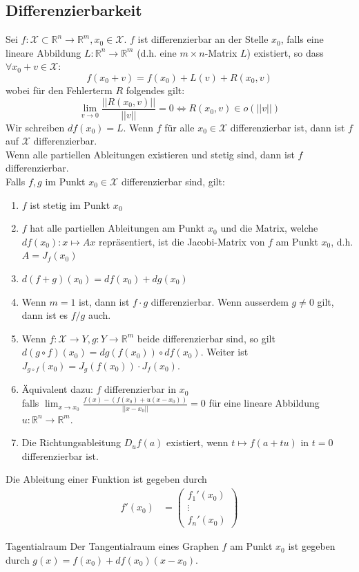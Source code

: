 \documentclass[a4paper,10pt]{article}
\def\R{\mathbb{R}}
\def\X{\mathcal{X}}
\begin{document}
\subsection{Differenzierbarkeit}
Sei \(f: \X \subset \R^n \to \R^m, x_0 \in \X\). \(f\) ist differenzierbar an der Stelle \(x_0\), falls eine lineare Abbildung \(L: \R^n \to \R^m\) (d.h. eine \(m \times n\)-Matrix \(L\)) existiert, so dass \(\forall x_0 + v \in \X\):
\[f(x_0 + v) = f(x_0) + L(v) + R(x_0,v)\]
wobei für den Fehlerterm \(R\) folgendes gilt: 
$$\lim_{v \to 0} \frac{||R(x_0,v)||}{||v||} = 0 \iff R(x_0, v) \in o(||v||)$$
Wir schreiben \(df(x_0) = L\). Wenn \(f\) für alle \(x_0 \in \X\) differenzierbar ist, dann ist \(f\) auf \(\X\) differenzierbar. \\
Wenn alle partiellen Ableitungen existieren und stetig sind, dann ist \(f\) differenzierbar.\\
Falls \(f,g\) im Punkt \(x_0 \in \X\) differenzierbar sind, gilt:
\begin{enumerate}
  \item \(f\) ist stetig im Punkt \(x_0\)
  \item \(f\) hat alle partiellen Ableitungen am Punkt \(x_0\) und die Matrix, welche \(df(x_0): x \mapsto Ax\) repräsentiert, ist die Jacobi-Matrix von \(f\) am Punkt \(x_0\), d.h. \(A = J_f(x_0)\)
  \item \(d(f+g)(x_0) = df(x_0) + dg(x_0)\)
  \item Wenn \(m = 1\) ist, dann ist \(f\cdot g\) differenzierbar. Wenn ausserdem \(g \ne 0\) gilt, dann ist es \(f/g\) auch.
  \item Wenn \(f: \X \to Y, g: Y \to \R^m\) beide differenzierbar sind, so gilt \(d(g \circ f)(x_0) = dg(f(x_0)) \circ df(x_0)\). 
  Weiter ist \(J_{g \circ f}(x_0) = J_g(f(x_0)) \cdot J_f(x_0)\).
  \item Äquivalent dazu: $f$ differenzierbar in $x_0$\\
  falls $\lim_{x \rightarrow x_0} \frac{f(x) - (f(x_0) + u(x - x_0))}{||x - x_0||} = 0$ für eine lineare Abbildung $u: \mathbb{R}^n \rightarrow \mathbb{R}^m$.
  \item Die Richtungsableitung $D_u f(a)$ existiert, wenn $t \mapsto f(a + tu)$ in $t = 0$ differenzierbar ist.
\end{enumerate}
Die Ableitung einer Funktion ist gegeben durch
\begin{align*}
  f'(x_0) &= \begin{pmatrix}
    f_1'(x_0)\\
    \vdots\\
    f_n'(x_0)
  \end{pmatrix}
\end{align*}
\begin{subbox}{Tagentialraum}
  Der Tangentialraum eines Graphen \(f\) am Punkt \(x_0\) ist gegeben durch \(g(x) = f(x_0) + df(x_0)(x-x_0)\).
\end{subbox}
\end{document}
